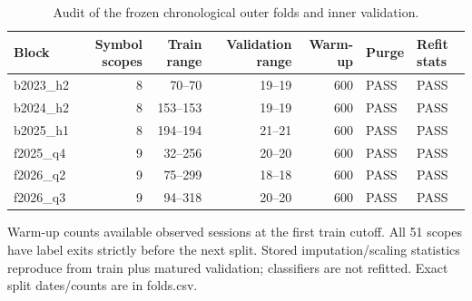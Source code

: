 \begin{table}[htbp]
\centering\small
\caption{Audit of the frozen chronological outer folds and inner validation.}
\label{tab:r2_folds}
\setlength{\tabcolsep}{3.5pt}
\begin{tabular}{lrrrrll}
\hline
Block & Symbol scopes & Train range & Validation range & Warm-up & Purge & Refit stats \\
\hline
b2023\_h2 & 8 & 70--70 & 19--19 & 600 & PASS & PASS \\
b2024\_h2 & 8 & 153--153 & 19--19 & 600 & PASS & PASS \\
b2025\_h1 & 8 & 194--194 & 21--21 & 600 & PASS & PASS \\
f2025\_q4 & 9 & 32--256 & 20--20 & 600 & PASS & PASS \\
f2026\_q2 & 9 & 75--299 & 18--18 & 600 & PASS & PASS \\
f2026\_q3 & 9 & 94--318 & 20--20 & 600 & PASS & PASS \\
\hline
\end{tabular}
\par\smallskip\footnotesize Warm-up counts available observed sessions at the first train cutoff. All 51 scopes have label exits strictly before the next split. Stored imputation/scaling statistics reproduce from train plus matured validation; classifiers are not refitted. Exact split dates/counts are in folds.csv.
\end{table}
